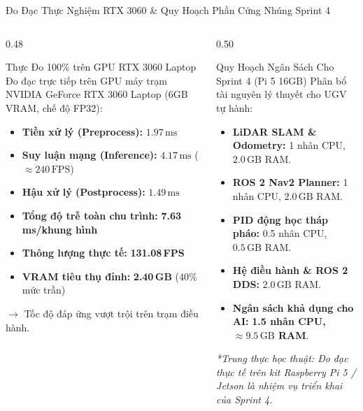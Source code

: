 \documentclass[aspectratio=169, 10pt]{beamer}
\begin{document}
\begin{frame}{Đo Đạc Thực Nghiệm RTX 3060 \& Quy Hoạch Phần Cứng Nhúng Sprint 4}
\begin{columns}[T]
\begin{column}{0.48\textwidth}
    \begin{block}{Thực Đo 100\% trên GPU RTX 3060 Laptop}
    \scriptsize
    Đo đạc trực tiếp trên GPU máy trạm NVIDIA GeForce RTX 3060 Laptop (6GB VRAM, chế độ FP32):
    \begin{itemize}\setlength{\itemsep}{1pt}
        \item \textbf{Tiền xử lý (Preprocess):} $1.97\,\text{ms}$
        \item \textbf{Suy luận mạng (Inference):} $4.17\,\text{ms}$ ($\approx 240\,\text{FPS}$)
        \item \textbf{Hậu xử lý (Postprocess):} $1.49\,\text{ms}$
        \item \textbf{Tổng độ trễ toàn chu trình:} \textbf{7.63\,ms/khung hình}
        \item \textbf{Thông lượng thực tế:} \textbf{131.08\,FPS}
        \item \textbf{VRAM tiêu thụ đỉnh:} \textbf{2.40\,GB} ($40\%$ mức trần)
    \end{itemize}
    $\rightarrow$ Tốc độ đáp ứng vượt trội trên trạm điều hành.
    \end{block}
\end{column}
\begin{column}{0.50\textwidth}
    \begin{exampleblock}{Quy Hoạch Ngân Sách Cho Sprint 4 (Pi 5 16GB)}
    \scriptsize
    Phân bổ tài nguyên lý thuyết cho UGV tự hành:
    \begin{itemize}\setlength{\itemsep}{1pt}
        \item \textbf{LiDAR SLAM \& Odometry:} 1 nhân CPU, $2.0\,\text{GB}$ RAM.
        \item \textbf{ROS 2 Nav2 Planner:} 1 nhân CPU, $2.0\,\text{GB}$ RAM.
        \item \textbf{PID động học tháp pháo:} 0.5 nhân CPU, $0.5\,\text{GB}$ RAM.
        \item \textbf{Hệ điều hành \& ROS 2 DDS:} $2.0\,\text{GB}$ RAM.
        \item \textbf{Ngân sách khả dụng cho AI:} \textbf{1.5 nhân CPU, $\approx 9.5\,\text{GB}$ RAM}.
    \end{itemize}
    \textit{*Trung thực học thuật: Đo đạc thực tế trên kit Raspberry Pi 5 / Jetson là nhiệm vụ triển khai của Sprint 4.}
    \end{exampleblock}
\end{column}
\end{columns}
\end{frame}
\end{document}
